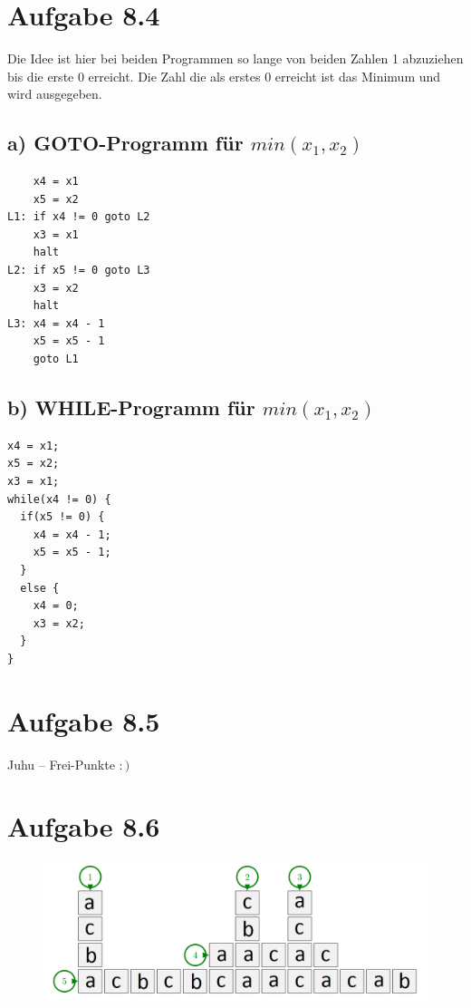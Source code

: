 \documentclass{article}
\begin{document}
\section*{Aufgabe 8.4}
Die Idee ist hier bei beiden Programmen so lange von beiden Zahlen 1 abzuziehen bis die erste 0 erreicht. Die Zahl die als erstes 0 erreicht ist das Minimum und wird ausgegeben.
\subsection*{a) GOTO-Programm für $min(x_1,x_2)$}
\begin{verbatim}
    x4 = x1
    x5 = x2
L1: if x4 != 0 goto L2
    x3 = x1
    halt
L2: if x5 != 0 goto L3
    x3 = x2
    halt
L3: x4 = x4 - 1
    x5 = x5 - 1
    goto L1
\end{verbatim}
\newpage
\subsection*{b) WHILE-Programm für $min(x_1,x_2)$}
\begin{verbatim}
x4 = x1;
x5 = x2;
x3 = x1;
while(x4 != 0) {
  if(x5 != 0) {
    x4 = x4 - 1;
    x5 = x5 - 1;
  }
  else {
    x4 = 0;
    x3 = x2;
  }
}
\end{verbatim}
\section*{Aufgabe 8.5}

Juhu -- Frei-Punkte $:)$




\section*{Aufgabe 8.6}
\begin{figure}[!h]
  \includegraphics[scale=0.4]{crossword.png}
\end{figure}
\end{document}
